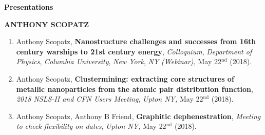 \documentclass[prl,tighten,amsmath,amssymb,floatfix]{revtex4-1}
\begin{document}
\textbf{Presentations}

\textbf{ANTHONY SCOPATZ}
\vskip 12pt

\begin{enumerate}

\item Anthony Scopatz, {\bf Nanostructure challenges and successes from 16th century warships to 21st century energy},
{\it Colloquium},
{\it Department of Physics},
{\it Columbia University},
{\it New York},
{\it NY}
{\it (Webinar)}{\it ,} { May }22$^\mathrm{nd}$
(2018).

\item Anthony Scopatz, {\bf Clustermining: extracting core structures of metallic nanoparticles from the atomic pair distribution function},
{\it 2018 NSLS-II and CFN Users Meeting},
{\it Upton NY}{\it ,} { May }22$^\mathrm{nd}$
(2018).

\item Anthony Scopatz, Anthony B Friend, {\bf Graphitic dephenestration},
{\it Meeting to check flexibility on dates},
{\it Upton NY}{\it ,} { May }22$^\mathrm{nd}$
(2018).

\end{enumerate}
\end{document}
